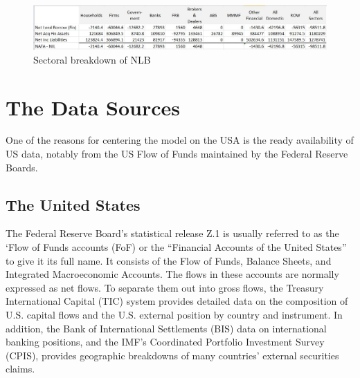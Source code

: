 \documentclass[twoside,a4paper,11pt]{article}
\begin{document}
\begin{figure}
  \includegraphics[width=\linewidth]{NLB.jpg}
  \caption{Sectoral breakdown of NLB}
  \label{fig:nlb}
\end{figure}

\section{The Data Sources}
One of the reasons for centering the model on the USA is the ready availability of US data, notably  from the US Flow of Funds maintained by the Federal Reserve Boards.   
\subsection{The United States}
The Federal Reserve Board's statistical release Z.1 is  usually referred to as the `Flow of Funds accounts (FoF) or the ``Financial Accounts of the United States'' to give it its full name. It consists of the Flow of Funds, Balance Sheets, and Integrated Macroeconomic Accounts. The flows in these accounts are normally expressed as net flows. To separate them out into gross flows, the Treasury International Capital (TIC) system provides detailed data on the composition of U.S. capital flows and the U.S. external position by country and instrument. In addition, the Bank of International Settlements (BIS) data on international banking positions, and the IMF’s Coordinated Portfolio Investment Survey (CPIS), provides geographic breakdowns of many countries’ external securities claims.
\end{document}
